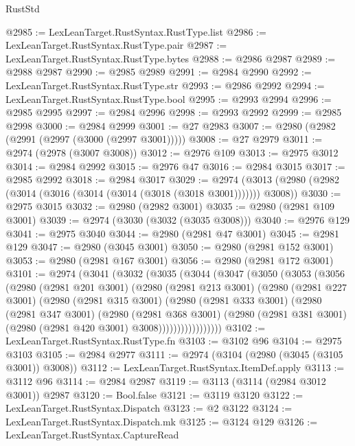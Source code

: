 \begin{lexlean}{RustStd}
\begin{coremodule}
@2985 := LexLeanTarget.RustSyntax.RustType.list
@2986 := LexLeanTarget.RustSyntax.RustType.pair
@2987 := LexLeanTarget.RustSyntax.RustType.bytes
@2988 := @2986 @2987
@2989 := @2988 @2987
@2990 := @2985 @2989
@2991 := @2984 @2990
@2992 := LexLeanTarget.RustSyntax.RustType.str
@2993 := @2986 @2992
@2994 := LexLeanTarget.RustSyntax.RustType.bool
@2995 := @2993 @2994
@2996 := @2985 @2995
@2997 := @2984 @2996
@2998 := @2993 @2992
@2999 := @2985 @2998
@3000 := @2984 @2999
@3001 := @27 @2983
@3007 := @2980 (@2982 (@2991 (@2997 (@3000 (@2997 @3001)))))
@3008 := @27 @2979
@3011 := @2974 (@2978 (@3007 @3008))
@3012 := @2976 @109
@3013 := @2975 @3012
@3014 := @2984 @2992
@3015 := @2976 @47
@3016 := @2984 @3015
@3017 := @2985 @2992
@3018 := @2984 @3017
@3029 := @2974 (@3013 (@2980 (@2982 (@3014 (@3016 (@3014 (@3014 (@3018 (@3018 @3001))))))) @3008))
@3030 := @2975 @3015
@3032 := @2980 (@2982 @3001)
@3035 := @2980 (@2981 @109 @3001)
@3039 := @2974 (@3030 (@3032 (@3035 @3008)))
@3040 := @2976 @129
@3041 := @2975 @3040
@3044 := @2980 (@2981 @47 @3001)
@3045 := @2981 @129
@3047 := @2980 (@3045 @3001)
@3050 := @2980 (@2981 @152 @3001)
@3053 := @2980 (@2981 @167 @3001)
@3056 := @2980 (@2981 @172 @3001)
@3101 := @2974
    (@3041
      (@3032
        (@3035
          (@3044
            (@3047
              (@3050
                (@3053
                  (@3056
                    (@2980
                      (@2981 @201 @3001)
                      (@2980
                        (@2981 @213 @3001)
                        (@2980
                          (@2981 @227 @3001)
                          (@2980
                            (@2981 @315 @3001)
                            (@2980
                              (@2981 @333 @3001)
                              (@2980
                                (@2981 @347 @3001)
                                (@2980
                                  (@2981 @368 @3001)
                                  (@2980
                                    (@2981 @381 @3001)
                                    (@2980 (@2981 @420 @3001) @3008)))))))))))))))))
@3102 := LexLeanTarget.RustSyntax.RustType.fn
@3103 := @3102 @96
@3104 := @2975 @3103
@3105 := @2984 @2977
@3111 := @2974 (@3104 (@2980 (@3045 (@3105 @3001)) @3008))
@3112 := LexLeanTarget.RustSyntax.ItemDef.apply
@3113 := @3112 @96
@3114 := @2984 @2987
@3119 := @3113 (@3114 (@2984 @3012 @3001)) @2987
@3120 := Bool.false
@3121 := @3119 @3120
@3122 := LexLeanTarget.RustSyntax.Dispatch
@3123 := @2 @3122
@3124 := LexLeanTarget.RustSyntax.Dispatch.mk
@3125 := @3124 @129
@3126 := LexLeanTarget.RustSyntax.CaptureRead

\end{coremodule}
\end{lexlean}
